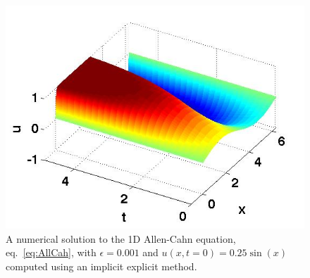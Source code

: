 \begin{figure}
\begin{center}
\includegraphics[scale=.2]{./ExamplesInMatlab/Allen_Cahn_BE_1D}
\caption{A numerical solution to the 1D Allen-Cahn equation, eq.\ \eqref{eq:AllCah}, with $\epsilon=0.001$ and $u(x,t=0)=0.25\sin(x)$ computed using an implicit explicit method.} \label{fig:AllenCahnIE1dMatlab}
\end{center}
\end{figure}

